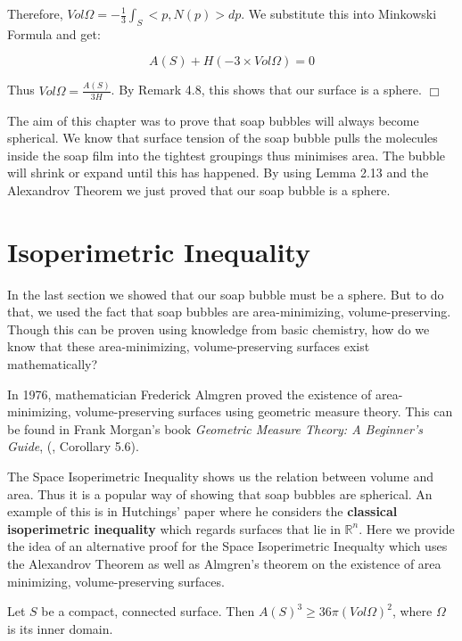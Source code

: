 \documentclass[a4paper,12pt]{report}
\begin{document}
Therefore, $Vol\Omega = -\frac{1}{3}\int_{S} <p,N(p)>dp$. We substitute this into Minkowski Formula and get:

\[
A(S) + H (-3 \times Vol\Omega) = 0
\]

Thus $Vol\Omega = \frac{A(S)}{3H}$. By Remark 4.8, this shows that our surface is a sphere. \hfill $\Box$\newline

The aim of this chapter was to prove that soap bubbles will always become spherical. We know that surface tension of the soap bubble pulls the molecules inside the soap film into the tightest groupings thus minimises area. The bubble will shrink or expand until this has happened. By using Lemma 2.13 and the Alexandrov Theorem we just proved that our soap bubble is a sphere.

\section{Isoperimetric Inequality}

In the last section we showed that our soap bubble must be a sphere. But to do that, we used the fact that soap bubbles are area-minimizing, volume-preserving. Though this can be proven using knowledge from basic chemistry, how do we know that these area-minimizing, volume-preserving surfaces exist mathematically?\par 
In 1976, mathematician Frederick Almgren proved the existence of area-minimizing, volume-preserving surfaces using geometric measure theory. This can be found in Frank Morgan's book \textit{Geometric Measure Theory: A Beginner's Guide}, (\cite{morgan}, Corollary 5.6). 

The Space Isoperimetric Inequality shows us the relation between volume and area. Thus it is a popular way of showing that soap bubbles are spherical. An example of this is in Hutchings' paper \cite{hutchings} where he considers the \textbf{classical isoperimetric inequality} which regards surfaces that lie in $\mathbb{R}^{n}$. Here we provide the idea of an alternative proof for the Space Isoperimetric Inequalty which uses the Alexandrov Theorem as well as Almgren's theorem on the existence of area minimizing, volume-preserving surfaces.

\begin{theorem}
Let $S$ be a compact, connected surface. Then $A(S)^{3} \geq 36\pi(Vol\Omega)^{2}$, where $\Omega$ is its inner domain.
\end{theorem}
\end{document}
